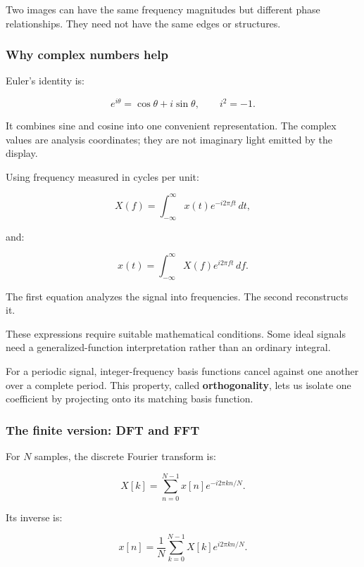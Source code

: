 Two images can have the same frequency magnitudes but different phase relationships. They need not have the same edges or structures.

\subsubsection{Why complex numbers help}\label{04-visual-computing-ii-ch042-why-complex-numbers-help}

\hypertarget{04-visual-computing-ii-ch042-why-complex-numbers-help}{}

Euler's identity is:

\[
e^{i\theta}=\cos\theta+i\sin\theta,\qquad i^2=-1.
\]

It combines sine and cosine into one convenient representation. The complex values are analysis coordinates; they are not imaginary light emitted by the display.

Using frequency measured in cycles per unit:

\[
X(f)=\int_{-\infty}^{\infty}x(t)e^{-i2\pi ft}\,dt,
\]

and:

\[
x(t)=\int_{-\infty}^{\infty}X(f)e^{i2\pi ft}\,df.
\]

The first equation analyzes the signal into frequencies. The second reconstructs it.

These expressions require suitable mathematical conditions. Some ideal signals need a generalized-function interpretation rather than an ordinary integral.

For a periodic signal, integer-frequency basis functions cancel against one another over a complete period. This property, called \textbf{orthogonality}, lets us isolate one coefficient by projecting onto its matching basis function.

\subsubsection{The finite version: DFT and FFT}\label{04-visual-computing-ii-ch042-the-finite-version-dft-and-fft}

\hypertarget{04-visual-computing-ii-ch042-the-finite-version-dft-and-fft}{}

For \(N\) samples, the discrete Fourier transform is:

\[
X[k]=\sum_{n=0}^{N-1}x[n]e^{-i2\pi kn/N}.
\]

Its inverse is:

\[
x[n]=\frac1N\sum_{k=0}^{N-1}X[k]e^{i2\pi kn/N}.
\]

